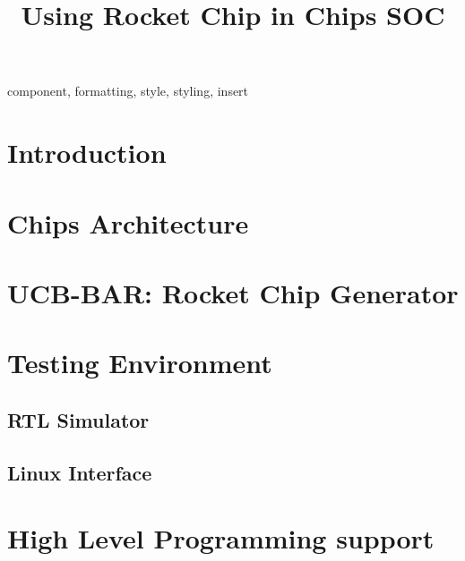 \documentclass[12pt,conference]{IEEEtran}
\begin{document}
\title{Using Rocket Chip in Chips SOC
}

\author{
}

\maketitle

\begin{abstract}
\blindtext
\end{abstract}

\begin{IEEEkeywords}
component, formatting, style, styling, insert
\end{IEEEkeywords}
\section{Introduction}
\blindtext 

\blindtext

\section{Chips Architecture}



\section{UCB-BAR: Rocket Chip Generator}

\section{Testing Environment}
\blindtext
\subsection{RTL Simulator}
\blindtext
\subsection{Linux Interface}
\blindtext

\section{High Level Programming support}
\blindtext
\end{document}
